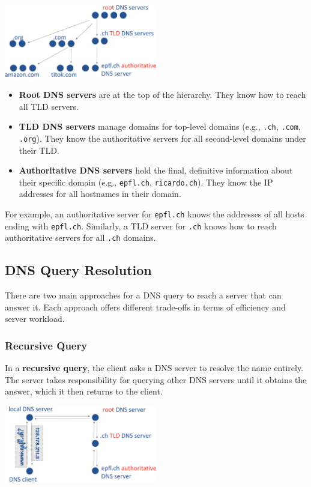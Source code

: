 \documentclass[../../compsys.tex]{subfiles}
\begin{document}
\begin{center}
    \includegraphics[width=0.5\textwidth]{images/hiearchy.png}
\end{center}

\begin{itemize}
    \item \textbf{Root DNS servers} are at the top of the hierarchy. They know how to reach all TLD servers.
    \item \textbf{TLD DNS servers} manage domains for top-level domains (e.g., \texttt{.ch}, \texttt{.com}, \texttt{.org}). They know the authoritative servers for all second-level domains under their TLD.
    \item \textbf{Authoritative DNS servers} hold the final, definitive information about their specific domain (e.g., \texttt{epfl.ch}, \texttt{ricardo.ch}). They know the IP addresses for all hostnames in their domain.
\end{itemize}

For example, an authoritative server for \texttt{epfl.ch} knows the addresses of all hosts ending with \texttt{epfl.ch}. Similarly, a TLD server for \texttt{.ch} knows how to reach authoritative servers for all \texttt{.ch} domains.

\subsection{DNS Query Resolution}
There are two main approaches for a DNS query to reach a server that can answer it. Each approach offers different trade-offs in terms of efficiency and server workload.

\subsubsection{Recursive Query}
In a \textbf{recursive query}, the client asks a DNS server to resolve the name entirely. The server takes responsibility for querying other DNS servers until it obtains the answer, which it then returns to the client.

\begin{center}
    \includegraphics[width=0.5\textwidth]{images/recursive.png}
\end{center}
\end{document}
